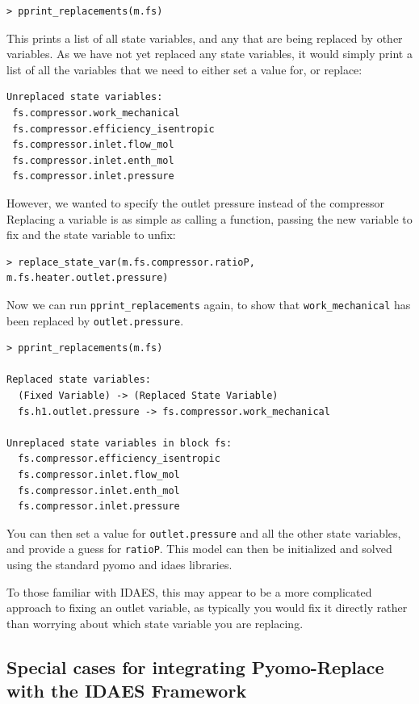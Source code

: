 \begin{verbatim}
> pprint_replacements(m.fs)
\end{verbatim}

This prints a list of all state variables, and any that are being
replaced by other variables. As we have not yet replaced any state
variables, it would simply print a list of all the variables that we
need to either set a value for, or replace:

\begin{verbatim}
Unreplaced state variables:
 fs.compressor.work_mechanical
 fs.compressor.efficiency_isentropic
 fs.compressor.inlet.flow_mol
 fs.compressor.inlet.enth_mol
 fs.compressor.inlet.pressure
\end{verbatim}

However, we wanted to specify the outlet pressure instead of the
compressor Replacing a variable is as simple as calling a function,
passing the new variable to fix and the state variable to unfix:

\begin{verbatim}
> replace_state_var(m.fs.compressor.ratioP, m.fs.heater.outlet.pressure)
\end{verbatim}

Now we can run \texttt{pprint\_replacements} again, to show that
\texttt{work\_mechanical} has been replaced by \texttt{outlet.pressure}.

\begin{verbatim}
> pprint_replacements(m.fs)

Replaced state variables:
  (Fixed Variable) -> (Replaced State Variable)
  fs.h1.outlet.pressure -> fs.compressor.work_mechanical

Unreplaced state variables in block fs:
  fs.compressor.efficiency_isentropic
  fs.compressor.inlet.flow_mol
  fs.compressor.inlet.enth_mol
  fs.compressor.inlet.pressure
\end{verbatim}

You can then set a value for \texttt{outlet.pressure} and all the other
state variables, and provide a guess for \texttt{ratioP}. This model can
then be initialized and solved using the standard pyomo and idaes
libraries.

To those familiar with IDAES, this may appear to be a more complicated
approach to fixing an outlet variable, as typically you would fix it
directly rather than worrying about which state variable you are
replacing.

\hypertarget{special-cases-for-integrating-pyomo-replace-with-the-idaes-framework}{%
\subsection{Special cases for integrating Pyomo-Replace with the IDAES
Framework}\label{special-cases-for-integrating-pyomo-replace-with-the-idaes-framework}}

